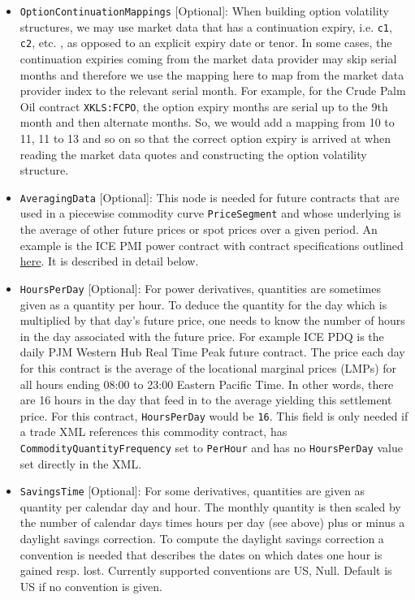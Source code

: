 \begin{itemize}
\item \lstinline!OptionContinuationMappings! [Optional]: When building option volatility structures, we may use market data that has a continuation expiry, i.e. \lstinline!c1!, \lstinline!c2!, etc. , as opposed to an explicit expiry date or tenor. In some cases, the continuation expiries coming from the market data provider may skip serial months and therefore we use the mapping here to map from the market data provider index to the relevant serial month. For example, for the Crude Palm Oil contract \lstinline!XKLS:FCPO!, the option expiry months are serial up to the 9th month and then alternate months. So, we would add a mapping from 10 to 11, 11 to 13 and so on so that the correct option expiry is arrived at when reading the market data quotes and constructing the option volatility structure.
\item \lstinline!AveragingData! [Optional]: This node is needed for future contracts that are used in a piecewise commodity curve \lstinline!PriceSegment! and whose underlying is the average of other future prices or spot prices over a given period. An example is the ICE PMI power contract with contract specifications outlined \href{https://www.theice.com/products/6590369/PJM-Western-Hub-Real-Time-Peak-1-MW-Fixed-Price-Future}{here}. It is described in detail below.
\item \lstinline!HoursPerDay! [Optional]: For power derivatives, quantities are sometimes given as a quantity per hour. To deduce the quantity for the day which is multiplied by that day's future price, one needs to know the number of hours in the day associated with the future price. For example ICE PDQ is the daily PJM Western Hub Real Time Peak future contract. The price each day for this contract is the average of the locational marginal prices (LMPs) for all hours ending 08:00 to 23:00 Eastern Pacific Time. In other words, there are 16 hours in the day that feed in to the average yielding this settlement price. For this contract, \lstinline!HoursPerDay! would be \lstinline!16!. This field is only needed if a trade XML references this commodity contract, has \lstinline!CommodityQuantityFrequency! set to \lstinline!PerHour! and has no \lstinline!HoursPerDay! value set directly in the XML.
\item \lstinline!SavingsTime! [Optional]: For some derivatives, quantities are given as quantity per calendar day and hour. The monthly quantity is then scaled by the number of calendar days times hours per day (see above) plus or minus a daylight savings correction. To compute the daylight savings correction a convention is needed that describes the dates on which dates one hour is gained resp. lost. Currently supported conventions are US, Null. Default is US if no convention is given.

\end{itemize}
